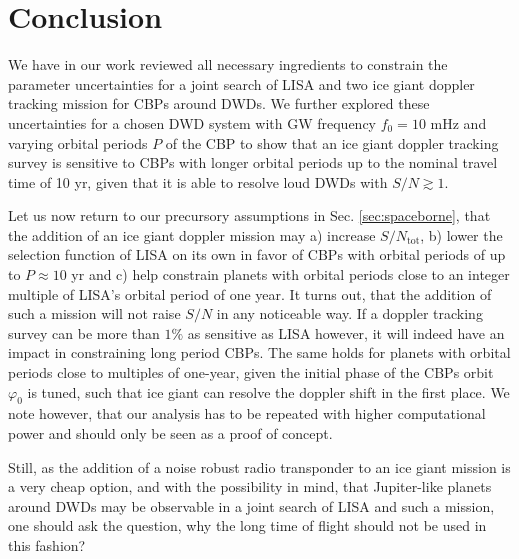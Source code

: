 \documentclass{aa}
\newcommand{\TD}[1]{\textcolor{magenta}{\bf [To do] #1}}
\begin{document}


\section{Conclusion}
\label{sec:conclusion}

We have in our work reviewed all necessary ingredients to constrain the parameter uncertainties for a joint search of LISA and two ice giant doppler tracking mission for CBPs around DWDs. We further explored these uncertainties for a chosen DWD system with GW frequency $f_0=10$ mHz and varying orbital periods $P$ of the CBP to show that an ice giant doppler tracking survey is sensitive to CBPs with longer orbital periods up to the nominal travel time of 10 yr, given that it is able to resolve loud DWDs with $S/N\gtrsim 1$.

Let us now return to our precursory assumptions in Sec. \ref{sec:spaceborne}, that the addition of an ice giant doppler mission may a) increase $S/N_\mathrm{tot}$, b) lower the selection function of LISA on its own in favor of CBPs with orbital periods of up to $P\approx10$ yr and c) help constrain planets with orbital periods close to an integer multiple of LISA's orbital period of one year. It turns out, that the addition of such a mission will not raise $S/N$ in any noticeable way. If a doppler tracking survey can be more than $1\%$ as sensitive as LISA however, it will indeed have an impact in constraining long period CBPs. The same holds for planets with orbital periods close to multiples of one-year, given the initial phase of the CBPs orbit $\varphi_0$ is tuned, such that ice giant can resolve the doppler shift in the first place. We note however, that our analysis has to be repeated with higher computational power and should only be seen as a proof of concept.

Still, as the addition of a noise robust radio transponder to an ice giant mission is a very cheap option, and with the possibility in mind, that Jupiter-like planets around DWDs may be observable in a joint search of LISA and such a mission, one should ask the question, why the long time of flight should not be used in this fashion?

\end{document}
